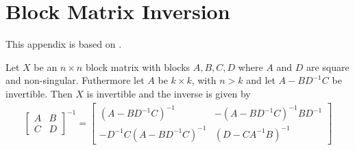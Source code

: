 \chapter{Block Matrix Inversion}\label{ch:block_matrix_inversion}
This appendix is based on \cite{Bierens2013}.
\begin{theorem}\label{th:block_matrix_inversion}
    Let $X$ be an $n \times n$ block matrix with blocks $A, B, C, D$ where $A$ and $D$ are square and non-singular.
    Futhermore let $A$ be $k \times k$, with $n > k$ and let $A-BD^{-1}C$ be invertible.
    Then $X$ is invertible and the inverse is given by
    \begin{align}
        \begin{bmatrix}
            A & B \\
            C & D
        \end{bmatrix}^{-1}
        =
        \begin{bmatrix}
            (A - BD^{-1}C)^{-1} &
            -(A - BD^{-1}C)^{-1}BD^{-1} \\
            -D^{-1}C(A - BD^{-1}C)^{-1} &
            (D - CA^{-1}B)^{-1}
        \end{bmatrix}
    \end{align}
\end{theorem}
